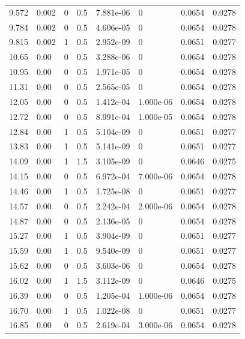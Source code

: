 \documentclass[preview]{standalone}
\begin{document}
{{\begin{tabular}{L{1.2cm}C{1.2cm} C{0.3cm}C{0.5cm} C{1.4cm}C{1.4cm} C{1.4cm}C{1.4cm}}
  9.572  &  0.002  & 0     & 0.5 &  7.881e-06  & 0  & 0.0654 &  0.0278   \\ 
  9.784  &  0.002  & 0     & 0.5 &  4.606e-05  & 0  & 0.0654 &  0.0278   \\ 
  9.815  &  0.002  & 1     & 0.5 &  2.952e-09  & 0  & 0.0651 &  0.0277   \\ 
  10.65  &  0.00  & 0     & 0.5 &  3.288e-06  & 0  & 0.0654 &  0.0278   \\ 
  10.95  &  0.00  & 0     & 0.5 &  1.971e-05  & 0  & 0.0654 &  0.0278   \\ 
  11.31  &  0.00  & 0     & 0.5 &  2.565e-05  & 0  & 0.0654 &  0.0278   \\ 
  12.05  &  0.00  & 0     & 0.5 &  1.412e-04  & 1.000e-06  & 0.0654 &  0.0278   \\ 
  12.72  &  0.00  & 0     & 0.5 &  8.991e-04  & 1.000e-05  & 0.0654 &  0.0278   \\ 
  12.84  &  0.00  & 1     & 0.5 &  5.104e-09  & 0  & 0.0651 &  0.0277   \\ 
  13.83  &  0.00  & 1     & 0.5 &  5.141e-09  & 0  & 0.0651 &  0.0277   \\ 
  14.09  &  0.00  & 1     & 1.5 &  3.105e-09  & 0  & 0.0646 &  0.0275   \\ 
  14.15  &  0.00  & 0     & 0.5 &  6.972e-04  & 7.000e-06  & 0.0654 &  0.0278   \\ 
  14.46  &  0.00  & 1     & 0.5 &  1.725e-08  & 0  & 0.0651 &  0.0277   \\ 
  14.57  &  0.00  & 0     & 0.5 &  2.242e-04  & 2.000e-06  & 0.0654 &  0.0278   \\ 
  14.87  &  0.00  & 0     & 0.5 &  2.136e-05  & 0  & 0.0654 &  0.0278   \\ 
  15.27  &  0.00  & 1     & 0.5 &  3.904e-09  & 0  & 0.0651 &  0.0277   \\ 
  15.59  &  0.00  & 1     & 0.5 &  9.540e-09  & 0  & 0.0651 &  0.0277   \\ 
  15.62  &  0.00  & 0     & 0.5 &  3.603e-06  & 0  & 0.0654 &  0.0278   \\ 
  16.02  &  0.00  & 1     & 1.5 &  3.112e-09  & 0  & 0.0646 &  0.0275   \\ 
  16.39  &  0.00  & 0     & 0.5 &  1.205e-04  & 1.000e-06  & 0.0654 &  0.0278   \\ 
  16.70  &  0.00  & 1     & 0.5 &  1.022e-08  & 0  & 0.0651 &  0.0277   \\ 
  16.85  &  0.00  & 0     & 0.5 &  2.619e-04  & 3.000e-06  & 0.0654 &  0.0278   \\ 

\end{tabular}}}
\end{document}
